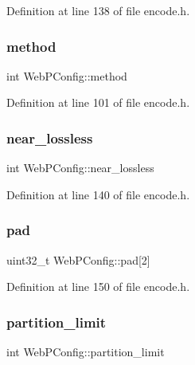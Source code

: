 Definition at line 138 of file encode.\+h.

\mbox{\label{struct_web_p_config_a9ff89da80dbd10d15f510f3c11b86d50}} 
\subsubsection{\texorpdfstring{method}{method}}
{\footnotesize\ttfamily int Web\+P\+Config\+::method}



Definition at line 101 of file encode.\+h.

\mbox{\label{struct_web_p_config_aaa49da995d138314195ed79ed44e0be4}} 
\subsubsection{\texorpdfstring{near\_lossless}{near\_lossless}}
{\footnotesize\ttfamily int Web\+P\+Config\+::near\+\_\+lossless}



Definition at line 140 of file encode.\+h.

\mbox{\label{struct_web_p_config_a1f91415636baf4d002ac13d366258269}} 
\subsubsection{\texorpdfstring{pad}{pad}}
{\footnotesize\ttfamily uint32\+\_\+t Web\+P\+Config\+::pad\mbox{[}2\mbox{]}}



Definition at line 150 of file encode.\+h.

\mbox{\label{struct_web_p_config_aee37a73b2ee4ef1833fa4871fd4b52e3}} 
\subsubsection{\texorpdfstring{partition\_limit}{partition\_limit}}
{\footnotesize\ttfamily int Web\+P\+Config\+::partition\+\_\+limit}



